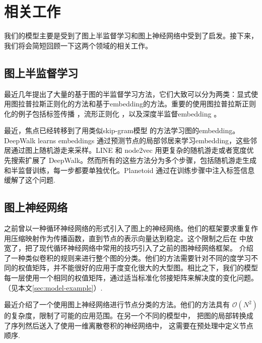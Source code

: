 \documentclass{article} %
\begin{document}
\section{相关工作}
我们的模型主要是受到了图上半监督学习和图上神经网络中受到了启发。接下来，我们将会简短回顾一下这两个领域的相关工作。

\subsection{图上半监督学习}
最近几年提出了大量的基于图的半监督学习方法，它们大致可以分为两类：显式使用图拉普拉斯正则化的方法和基于embedding的方法。重要的使用图拉普拉斯正则化的例子包括标签传播 \citep{zhu2003semi}，流形正则化 \citep{belkin2006manifold}，以及深度半监督embedding \citep{weston2012deep}。%

最近，焦点已经转移到了用类似skip-gram模型 \citep{mikolov2013distributed} 的方法学习图的embedding。DeepWalk \citep{perozzi2014deepwalk} learns embeddings 通过预测节点的局部邻居来学习embedding，这些邻居通过图上随机游走来采样。LINE \citep{tang2015line} 和 node2vec \citep{grovernode2vec} 用更复杂的随机游走或者宽度优先搜索扩展了 DeepWalk。然而所有的这些方法分为多个步骤，包括随机游走生成和半监督训练，每一步都要单独优化。Planetoid \citep{yang2016revisiting} 通过在训练步骤中注入标签信息缓解了这个问题.


\subsection{图上神经网络} \cite{gori2005new, scarselli2009graph} 之前曾以一种循环神经网络的形式引入了图上的神经网络。他们的框架要求重复作用压缩映射作为传播函数，直到节点的表示向量达到稳定。这个限制之后在 \cite{li2015gated} 中放宽了，把了现代循环神经网络中常用的技巧引入了之前的图神经网络框架。 \cite{duvenaud2015convolutional} 介绍了一种类似卷积的规则来进行整个图的分类。他们的方法需要针对不同的度学习不同的权值矩阵，并不能很好的应用于度变化很大的大型图。相比之下，我们的模型每一层使用一个相同的权值矩阵，通过适当标准化邻接矩阵来解决度的变化问题。（见本文\ref{sec:model-example}）.

最近\cite{atwood2016diffusion}介绍了一个使用图上神经网络进行节点分类的方法。他们的方法具有 $\mathcal{O}(N^2)$ 的复杂度，限制了可能的应用范围。在另一个不同的模型中， \cite{niepert2016learning} 把图的局部转换成了序列然后送入了使用一维离散卷积的神经网络中， 这需要在预处理中定义节点顺序.
\end{document}
